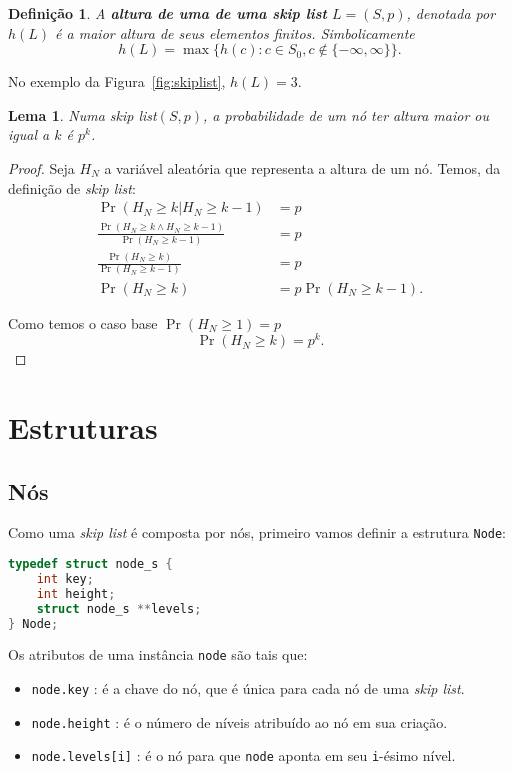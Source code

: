 \documentclass[paper=a4, fontsize=11pt]{scrartcl} %
\newtheorem{definition}{Definição}
\newtheorem{lemma}[theorem]{Lema}
\numberwithin{equation}{section}
\numberwithin{figure}{section}
\numberwithin{table}{section}
\numberwithin{definition}{section}
\numberwithin{theorem}{section}
\numberwithin{property}{section}
\numberwithin{proposition}{section}
\newcommand{\skl}{\textit{skip list}\xspace}
\renewcommand{\sl}{\textit{skip list}\xspace}
\begin{document}
\begin{definition}

A \textbf{altura de uma de uma \sl} $L = ( S, p )$, denotada por $h(L)$ é a maior altura de seus elementos finitos.
Simbolicamente
$$
h(L) = \max \{ h(c) : c \in S_0, c \notin \{ -\infty, \infty \} \}.
$$

\end{definition}

No exemplo da Figura~\ref{fig:skiplist}, $h(L) = 3$.

\begin{lemma} \label{lemma:prob_of_node_height}
 Numa \sl $(S, p)$, a probabilidade de um nó ter altura maior ou igual a $k$ é $p^k$.

\end{lemma}

\begin{proof}
Seja $H_N$ a variável aleatória que representa a altura de um nó. Temos, da definição de \sl:
\begin{align*}
\Pr(H_N \geq k | H_N \geq k - 1) &= p \\
\frac{\Pr(H_N \geq k \land H_N \geq k - 1)}{\Pr(H_N \geq k - 1)} &= p  \\
\frac{\Pr(H_N \geq k)}{\Pr(H_N \geq k - 1)} &= p  \\
\Pr(H_N \geq k) &= p \Pr(H_N \geq k - 1).
\end{align*}

Como temos o caso base $\Pr(H_N \geq 1) = p$
$$
\Pr(H_N \geq k) = p^k.
$$
\end{proof}
\section{Estruturas} \label{sec:estrut}



\subsection{Nós}

Como uma \skl é composta por nós, primeiro vamos definir a estrutura \verb|Node|:

\begin{lstlisting}[language=C]
typedef struct node_s {
    int key;
    int height;
    struct node_s **levels;
} Node;
\end{lstlisting}

Os atributos de uma instância \verb|node| são tais que:
\begin{itemize}[noitemsep]
  \item \verb|node.key| : é a chave do nó, que é única para cada nó de uma \skl.
  \item \verb|node.height| : é o número de níveis atribuído ao nó em sua criação.
  \item \verb|node.levels[i]| : é o nó para que \verb|node| aponta em seu \verb|i|-ésimo nível.
\end{itemize}
\end{document}
